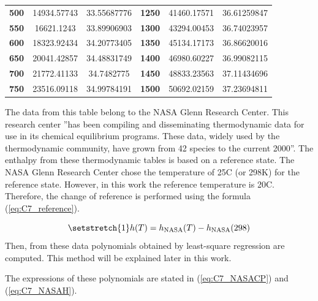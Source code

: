 \begin{longtable}[c]{@{}ccc|ccc@{}}
\textbf{500}                                      & 14934.57743         & 33.55687776            & \textbf{1250}                                   & 41460.17571         & 36.61259847            \\
\textbf{550}                                      & 16621.1243          & 33.89906903            & \textbf{1300}                                   & 43294.00453         & 36.74023957            \\
\textbf{600}                                      & 18323.92434         & 34.20773405            & \textbf{1350}                                   & 45134.17173         & 36.86620016            \\
\textbf{650}                                      & 20041.42857         & 34.48831749            & \textbf{1400}                                   & 46980.60227         & 36.99082115            \\
\textbf{700}                                      & 21772.41133         & 34.7482775             & \textbf{1450}                                   & 48833.23563         & 37.11434696            \\
\textbf{750}                                      & 23516.09118         & 34.99784191            & \textbf{1500}                                   & 50692.02159         & 37.23694811            \\* \bottomrule
\end{longtable}
The data from this table belong to the NASA Glenn Research Center. This research center ''has been compiling and disseminating thermodynamic data for use in its chemical equilibrium programs. These data, widely used by the thermodynamic community, have grown from 42 species to the current 2000''\cite{NASA}. The enthalpy from these thermodynamic tables is based on a reference state. The NASA Glenn Research Center chose the temperature of 25\degree C (or 298\degree K) for the reference state. 
However, in this work the reference temperature is 20\degree C. Therefore, the change of reference is performed using the formula (\ref{eq:C7_reference}).

\begin{equation}
\setstretch{1}
h(T) = h_\text{NASA}(T) - h_\text{NASA}(298)\label{eq:C7_reference}
\end{equation}
Then, from these data polynomials obtained by least-square regression are computed. This method will be explained later in this work.

The expressions of these polynomials are stated in (\ref{eq:C7_NASACP}) and (\ref{eq:C7_NASAH}).

